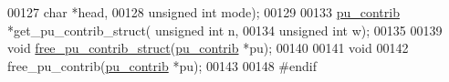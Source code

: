 \begin{DoxyCode}
00127             \textcolor{keywordtype}{char} *head,
00128             \textcolor{keywordtype}{unsigned} \textcolor{keywordtype}{int} mode);
00129 
00133 \hyperlink{group__data__structures_structpu__contrib}{pu\_contrib}  *get\_pu\_contrib\_struct( \textcolor{keywordtype}{unsigned} \textcolor{keywordtype}{int} n,
00134                                     \textcolor{keywordtype}{unsigned} \textcolor{keywordtype}{int} w);
00135 
00139 \textcolor{keywordtype}{void}        \hyperlink{group__up__cofold_gac20bd61824981d45ce0dc9934aa56df8}{free\_pu\_contrib\_struct}(\hyperlink{group__data__structures_structpu__contrib}{pu\_contrib} *pu);
00140 
00141 \textcolor{keywordtype}{void}
00142 free\_pu\_contrib(\hyperlink{group__data__structures_structpu__contrib}{pu\_contrib} *pu);
00143 
00148 \textcolor{preprocessor}{#endif}
\end{DoxyCode}
